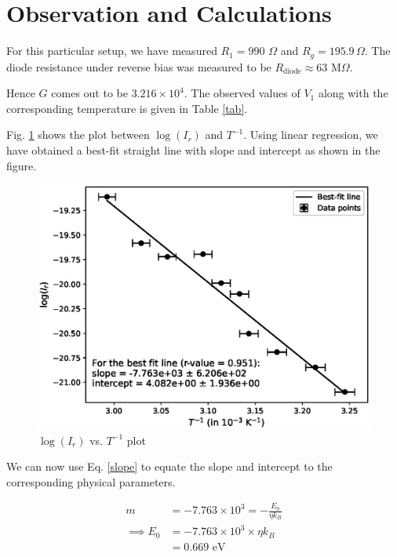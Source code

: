 \section{Observation and Calculations}

For this particular setup, we have measured $R_1 = 990$ $\Omega$ and $R_g = 195.9\,\Omega$. The diode resistance under reverse bias was measured to be $R_\text{diode} \approx 63$ M$\Omega$.

Hence $G$ comes out to be $3.216 \times 10^4$. The observed values of $V_1$ along with the corresponding temperature is given in Table \ref{tab}.



Fig. \ref{g} shows the plot between $\log(I_r)$ and $T^{-1}$. Using linear regression, we have obtained a best-fit straight line with slope and intercept as shown in the figure.

\begin{figure}
    \centering
    \includegraphics[width=1\columnwidth]{images/plot.eps}
    \caption{$\log(I_r)$ vs. $T^{-1}$ plot}
    \label{g}
\end{figure}

We can now use Eq. \ref{slope} to equate the slope and intercept to the corresponding physical parameters.

\begin{align*}
    m &= -7.763 \times 10^3 = -\frac{E_0}{\eta k_B}\\
    \implies E_0 &= -7.763 \times 10^3 \times \eta k_B\\
    &= 0.669 \text{ eV}
\end{align*}

